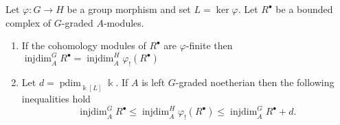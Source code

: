 \documentclass[11pt,fleqn]{article}
\renewcommand\to{\longrightarrow}
\renewcommand\phi{\varphi}
\renewcommand\k{\Bbbk}
\DeclareMathOperator\injdim{injdim}
\DeclareMathOperator\projdim{pdim}
\begin{document}
\begin{Lemma*}
Let $\phi: G \to H$ be a group morphism and set $L = \ker \phi$. Let 
$R^\bullet$ be a bounded complex of $G$-graded $A$-modules. 
\begin{enumerate}
\item 
\label{phi-finite-derived-injdim}
If the cohomology modules of $R^\bullet$ are $\phi$-finite then
$\injdim_A^{G} R^\bullet = \injdim_A^H \phi_!(R^\bullet)$

\item 
\label{noetherian-derived-injdim}
Let $d = \projdim_{\k[L]} \k$. If $A$ is left $G$-graded noetherian then 
the following inequalities hold
\[
  \injdim_A^G R^\bullet 
    \leq \injdim_A^H \phi_!(R^\bullet) 
    \leq \injdim_A^G R^\bullet + d.
\]
\end{enumerate}
\end{Lemma*}
\end{document}
